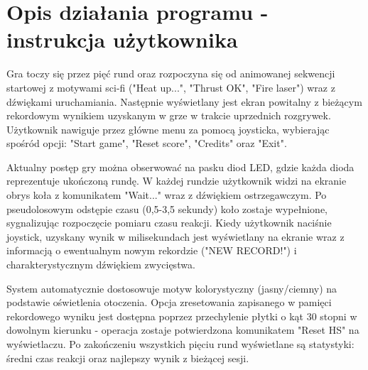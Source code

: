 \documentclass[a4paper,12pt]{report}
\begin{document}
\chapter{Opis działania programu - instrukcja użytkownika}
Gra toczy się przez pięć rund oraz rozpoczyna się od animowanej sekwencji startowej z motywami sci-fi ("Heat up...", "Thrust OK", "Fire laser") wraz z dźwiękami uruchamiania. Następnie wyświetlany jest ekran powitalny z bieżącym rekordowym wynikiem uzyskanym w grze w trakcie uprzednich rozgrywek. Użytkownik nawiguje przez główne menu za pomocą joysticka, wybierając spośród opcji: "Start game", "Reset score", "Credits" oraz "Exit".

Aktualny postęp gry można obserwować na pasku diod LED, gdzie każda dioda reprezentuje ukończoną rundę. W każdej rundzie użytkownik widzi na ekranie obrys koła z komunikatem "Wait..." wraz z dźwiękiem ostrzegawczym. Po pseudolosowym odstępie czasu (0,5-3,5 sekundy) koło zostaje wypełnione, sygnalizując rozpoczęcie pomiaru czasu reakcji. Kiedy użytkownik naciśnie joystick, uzyskany wynik w milisekundach jest wyświetlany na ekranie wraz z informacją o ewentualnym nowym rekordzie ("NEW RECORD!") i charakterystycznym dźwiękiem zwycięstwa.

System automatycznie dostosowuje motyw kolorystyczny (jasny/ciemny) na podstawie oświetlenia otoczenia. Opcja zresetowania zapisanego w pamięci rekordowego wyniku jest dostępna poprzez przechylenie płytki o kąt 30 stopni w dowolnym kierunku - operacja zostaje potwierdzona komunikatem "Reset HS" na wyświetlaczu. Po zakończeniu wszystkich pięciu rund wyświetlane są statystyki: średni czas reakcji oraz najlepszy wynik z bieżącej sesji.
\end{document}
